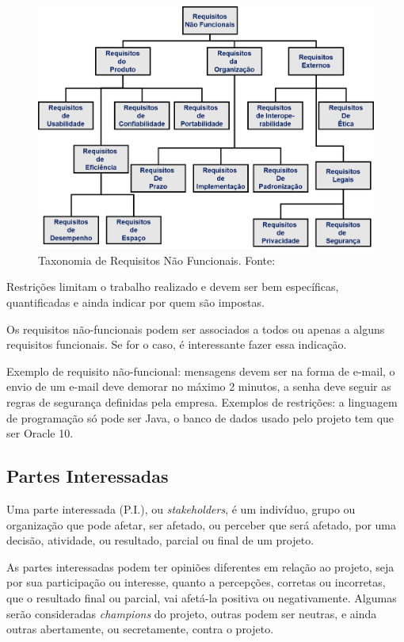 \documentclass{article}
\newcommand{\othersize}{0.7\linewidth}
\begin{document}
\begin{figure}
    \centering
    \includegraphics[width=\othersize]{imagens/NonFunReq.png}
    \caption{Taxonomia de Requisitos Não Funcionais. Fonte: \citet{sommerville:software:2015}}
    \label{fig:nofunreq}
\end{figure}

Restrições limitam o trabalho realizado e devem ser bem específicas, quantificadas e ainda indicar por quem são impostas.

Os requisitos não-funcionais podem ser associados a todos ou apenas a alguns requisitos funcionais. Se for o caso, é interessante fazer essa indicação.

Exemplo de requisito não-funcional: mensagens devem ser na forma de e-mail, o envio de um e-mail deve demorar no máximo 2 minutos, a senha deve seguir as regras de segurança definidas pela empresa. Exemplos de restrições: a linguagem de programação só pode ser Java, o banco de dados usado pelo projeto tem que ser Oracle 10.

\subsection{Partes Interessadas}

Uma parte interessada (P.I.), ou \textit{stakeholders}, é um indivíduo, grupo ou organização que pode afetar, ser afetado, ou perceber que será afetado, por uma decisão, atividade, ou resultado, parcial ou final de um projeto\citep{pmbok:6}.

As partes interessadas  podem ter opiniões diferentes em relação ao projeto, seja por sua participação ou interesse, quanto a percepções, corretas ou incorretas, que o resultado final ou parcial, vai afetá-la positiva ou negativamente.  Algumas serão consideradas \textit{champions} do projeto, outras podem ser neutras, e ainda outras abertamente, ou secretamente, contra o projeto.
\end{document}
